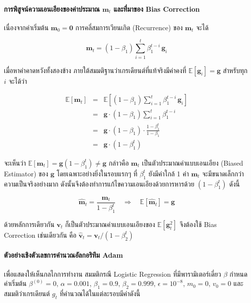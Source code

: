 \paragraph{การพิสูจน์ความเอนเอียงของค่าประมาณ $\mathbf{m}_t$ และที่มาของ Bias Correction}

เนื่องจากค่าเริ่มต้น $\mathbf{m}_0 = \mathbf{0}$ การคลี่สมการเวียนเกิด (Recurrence) ของ $\mathbf{m}_t$ จะได้

$$\mathbf{m}_t = (1 - \beta_1)\sum_{i=1}^{t} \beta_1^{t-i}\,\mathbf{g}_i$$

\noindent
เมื่อหาค่าคาดหวังทั้งสองข้าง ภายใต้สมมติฐานว่าเกรเดียนต์ที่แท้จริงมีค่าคงที่ $\mathbb{E}[\mathbf{g}_i] = \mathbf{g}$ สำหรับทุก $i$ จะได้ว่า

\begin{eqnarray} \nonumber
	\mathbb{E}[\mathbf{m}_t] &=& \mathbb{E}\left[(1-\beta_1)\sum_{i=1}^{t}\beta_1^{t-i}\,\mathbf{g}_i\right] \\ \nonumber
	&=& \mathbf{g}\cdot(1-\beta_1)\sum_{i=1}^{t}\beta_1^{t-i} \\ \nonumber
	&=& \mathbf{g}\cdot(1-\beta_1)\cdot\frac{1-\beta_1^t}{1-\beta_1} \\ \nonumber
	&=& \mathbf{g}\cdot(1-\beta_1^t)
\end{eqnarray}

\noindent
จะเห็นว่า $\mathbb{E}[\mathbf{m}_t] = \mathbf{g}(1 - \beta_1^t) \neq \mathbf{g}$ กล่าวคือ $\mathbf{m}_t$ เป็นตัวประมาณค่าแบบเอนเอียง (Biased Estimator) ของ $\mathbf{g}$ โดยเฉพาะอย่างยิ่งในรอบแรกๆ ที่ $\beta_1^t$ ยังมีค่าใกล้ 1 ค่า $\mathbf{m}_t$ จะมีขนาดเล็กกว่าความเป็นจริงอย่างมาก ดังนั้นจึงต้องทำการแก้ไขความเอนเอียงด้วยการหารด้วย $(1 - \beta_1^t)$ ดังนี้

$$\hat{\mathbf{m}}_t = \frac{\mathbf{m}_t}{1 - \beta_1^t} \quad \Longrightarrow \quad \mathbb{E}[\hat{\mathbf{m}}_t] = \mathbf{g}$$

\noindent
ด้วยหลักการเดียวกัน $\mathbf{v}_t$ ก็เป็นตัวประมาณค่าแบบเอนเอียงของ $\mathbb{E}[\mathbf{g}_t^2]$ จึงต้องใช้ Bias Correction เช่นเดียวกัน คือ $\hat{\mathbf{v}}_t = \mathbf{v}_t/(1 - \beta_2^t)$

\paragraph{ตัวอย่างเชิงตัวเลขการคำนวณอัลกอริทึม Adam}

เพื่อแสดงให้เห็นกลไกการทำงาน สมมติกรณี Logistic Regression ที่มีพารามิเตอร์เดี่ยว $\beta$ กำหนดค่าเริ่มต้น $\beta^{(0)} = 0$, $\alpha = 0.001$, $\beta_1 = 0.9$, $\beta_2 = 0.999$, $\epsilon = 10^{-8}$, $m_0 = 0$, $v_0 = 0$ และสมมติว่าเกรเดียนต์ $g_t$ ที่คำนวณได้ในแต่ละรอบมีค่าดังนี้

